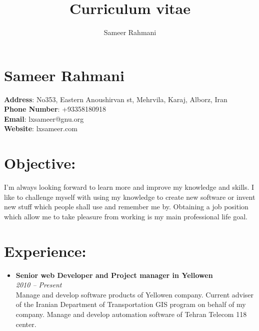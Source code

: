 \documentclass[a4paper,11pt]{article}
\author{Sameer Rahmani}
\title{Curriculum vitae}
\begin{document}
\maketitle
\newpage
\section*{Sameer Rahmani}
\textbf{Address}: No353, Eastern Anoushirvan st, Mehrvila, Karaj, Alborz, Iran\\
\textbf{Phone Number}: +93358180918\\
\textbf{Email}: lxsameer@gnu.org\\
\textbf{Website}: lxsameer.com\\

\section*{Objective:}
I'm always looking forward to learn more and improve my knowledge and skills.
I like to challenge myself with using my knowledge to create new software or
invent new stuff which people shall use and remember me by. Obtaining a job
position which allow me to take pleasure from working is my main professional
life goal.

\section*{Experience:}
\begin{itemize}
\item \textbf{Senior web Developer and Project manager in Yellowen}\\
\emph{2010 – Present}\\
  Manage and develop software products of Yellowen company. Current adviser of the Iranian Department of Transportation GIS program on behalf of my company.   Manage and develop automation software of Tehran Telecom 118 center.
\end{itemize}
\end{document}

